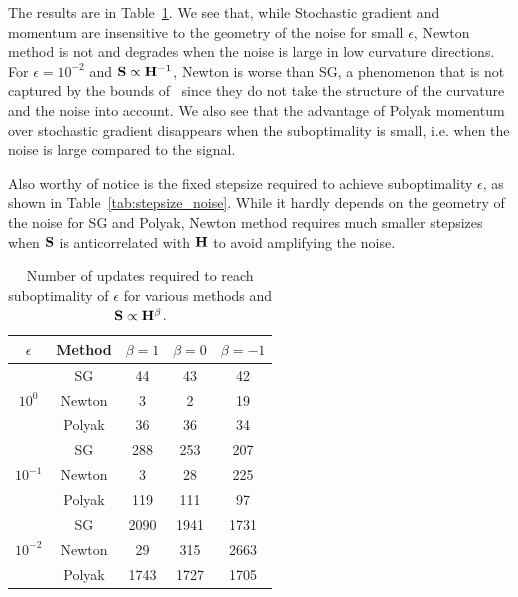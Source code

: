 The results are in Table~\ref{tab:iter_noise}. We see that, while Stochastic gradient and momentum are insensitive to the geometry of the noise for small $\epsilon$, Newton method is not and degrades when the noise is large in low curvature directions. For $\epsilon = 10^{-2}$ and ${\mathbf{S}} \propto {\mathbf{H}}^{-1}$, Newton is worse than SG, a phenomenon that is not captured by the bounds of~\citet{bottou2008tradeoffs} since they do not take the structure of the curvature and the noise into account. We also see that the advantage of Polyak momentum over stochastic gradient disappears when the suboptimality is small, i.e. when the noise is large compared to the signal.

Also worthy of notice is the fixed stepsize required to achieve suboptimality $\epsilon$, as shown in Table~\ref{tab:stepsize_noise}. While it hardly depends on the geometry of the noise for SG and Polyak, Newton method requires much smaller stepsizes when ${\mathbf{S}}$ is anticorrelated with ${\mathbf{H}}$ to avoid amplifying the noise.


\begin{table}
\centering
\begin{tabular}{|c|c||c|c|c|}
\hline
$\epsilon$&\textbf{Method} &   $\beta=1$ &   $\beta=0$ &   $\beta=-1$\\
\hline
\multirow{3}{*}{$10^0$}&SG              &   44 &   43 &   42\\
&Newton                                 &   3  &   2   &   19\\
&Polyak                                 &   36  &   36  &   34\\
\hline
\multirow{3}{*}{$10^{-1}$}&SG   &   288     &   253 &   207\\
&Newton                         &   3       &   28  &   225\\
&Polyak                         &   119     &   111 &   97\\
\hline
\multirow{3}{*}{$10^{-2}$}&SG   &   2090    &   1941    &   1731\\
&Newton                         &   29      &   315     &   2663\\
&Polyak                         &   1743    &   1727    &   1705\\
\hline
\end{tabular}
\caption{Number of updates required to reach suboptimality of $\epsilon$ for various methods and ${\mathbf{S}} \propto {\mathbf{H}}^\beta$.
\label{tab:iter_noise}}
\end{table}


